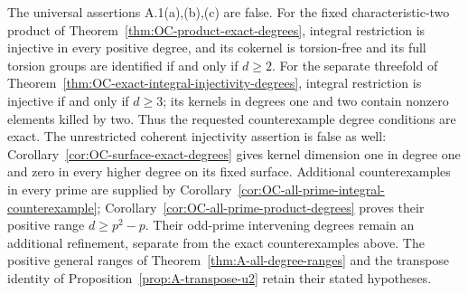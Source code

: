 \begin{remark}\label{open:A-small-degree}
The universal assertions A.1(a),(b),(c) are false. For the fixed
characteristic-two product of Theorem~\ref{thm:OC-product-exact-degrees},
integral restriction is injective in every positive degree, and its
cokernel is torsion-free and its full torsion groups are identified
if and only if $d\geq2$. For the separate threefold of
Theorem~\ref{thm:OC-exact-integral-injectivity-degrees}, integral
restriction is injective if and only if $d\geq3$; its kernels in
degrees one and two contain nonzero elements killed by two.
Thus the requested counterexample degree conditions are exact.
The unrestricted coherent injectivity assertion is false as well:
Corollary~\ref{cor:OC-surface-exact-degrees} gives kernel dimension
one in degree one and zero in every higher degree on its fixed surface.
Additional counterexamples in every prime are supplied by
Corollary~\ref{cor:OC-all-prime-integral-counterexample};
Corollary~\ref{cor:OC-all-prime-product-degrees} proves their positive
range $d\geq p^2-p$. Their odd-prime intervening degrees remain an
additional refinement, separate from the exact counterexamples above.
The positive general ranges of Theorem~\ref{thm:A-all-degree-ranges}
and the transpose identity of Proposition~\ref{prop:A-transpose-u2}
retain their stated hypotheses.
\end{remark}
